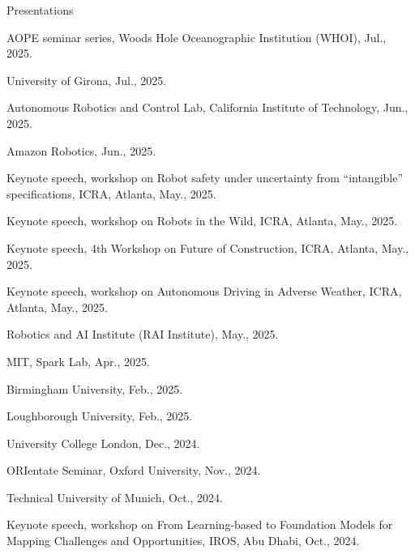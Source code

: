 \begin{rSection}{Presentations}

\begin{pubSubsectionNum}{}
  \item AOPE seminar series, Woods Hole Oceanographic Institution (WHOI), Jul., 2025.
  
  \item University of Girona, Jul., 2025.
   
  \item Autonomous Robotics and Control Lab, California Institute of Technology, Jun., 2025.
  
  \item Amazon Robotics, Jun., 2025.
  
  \item Keynote speech, workshop on Robot safety under uncertainty from ``intangible'' specifications, ICRA, Atlanta, May., 2025.
  
  \item Keynote speech, workshop on Robots in the Wild, ICRA, Atlanta, May., 2025.
  
  \item Keynote speech, 4th Workshop on Future of Construction, ICRA, Atlanta, May., 2025.
  
  \item Keynote speech, workshop on  Autonomous Driving in Adverse Weather, ICRA, Atlanta, May., 2025.
  
  \item Robotics and AI Institute (RAI Institute), May., 2025.
  
  \item MIT, Spark Lab, Apr., 2025.
  
  \item Birmingham University, Feb., 2025.
  
  \item Loughborough University, Feb., 2025.

  \item University College London, Dec., 2024.

  \item ORIentate Seminar, Oxford University, Nov., 2024.

  \item Technical University of Munich, Oct., 2024.

  \item Keynote speech, workshop on From Learning-based to Foundation Models for Mapping Challenges and Opportunities, IROS, Abu Dhabi, Oct., 2024.


\end{pubSubsectionNum}
\end{rSection}
